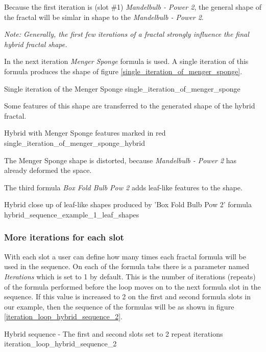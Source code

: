 Because the first iteration is (slot \#1) \emph{Mandelbulb - Power 2}, the general shape
of the fractal will be simlar in shape to the \emph{Mandelbulb - Power 2}.

\emph{Note: Generally, the first few iterations of a fractal strongly influence the final hybrid fractal shape.}

In the next iteration \emph{Menger Sponge} formula is used. A single iteration
of this formula produces the shape of figure \ref{single_iteration_of_menger_sponge}.

{Single iteration of the Menger Sponge}
{single_iteration_of_menger_sponge}

Some features of this shape are transferred to the generated shape of the hybrid fractal.

{Hybrid with Menger Sponge features marked in red}
{single_iteration_of_menger_sponge_hybrid}

The Menger Sponge shape is distorted, because \emph{Mandelbulb - Power 2} has
already deformed the space.

The third formula \emph{Box Fold Bulb Pow 2} adds leaf-like features to the shape.

{Hybrid close up of leaf-like shapes produced by 'Box Fold Bulb Pow 2' formula}
{hybrid_sequence_example_1_leaf_shapes}

\subsubsection{More iterations for each slot}

With each slot a user can define how many times each fractal formula will be used in the sequence.
On each of the formula tabs there is a parameter named \emph{Iterations} which is set to 1 by default.
This is the number of iterations (repeats) of the formula performed before the loop moves on to the next formula slot in the sequence.
If this value is increased to 2 on the first and second formula slots in our example,
then the sequence of the formulas will be as shown in figure \ref{iteration_loop_hybrid_sequence_2}. \label{two-iterations-per-slot}

{Hybrid sequence - The first and second slots set to 2 repeat iterations}
{iteration_loop_hybrid_sequence_2}

